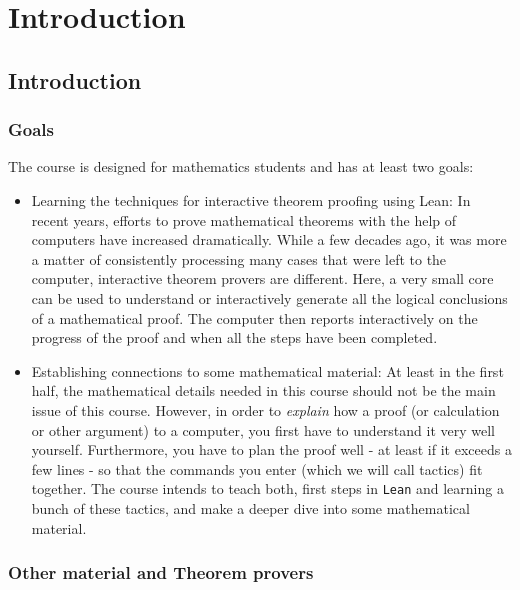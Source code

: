 \documentclass{memoir}
\begin{document}
\chapter{Introduction}



\section{Introduction}



\subsection{Goals}

The course is designed for mathematics students and has at least two goals:

\begin{itemize}
\item Learning the techniques for interactive theorem proofing using Lean: In recent years, efforts to prove mathematical theorems with the help of computers have increased dramatically. While a few decades ago, it was more a matter of consistently processing many cases that were left to the computer, interactive theorem provers are different. Here, a very small core can be used to understand or interactively generate all the logical conclusions of a mathematical proof. The computer then reports interactively on the progress of the proof and when all the steps have been completed.\item Establishing connections to some mathematical material: At least in the first half, the mathematical details needed in this course should not be the main issue of this course. However, in order to \emph{explain} how a proof (or calculation or other argument) to a computer, you first have to understand it very well yourself. Furthermore, you have to plan the proof well - at least if it exceeds a few lines - so that the commands you enter (which we will call tactics) fit together. The course intends to teach both, first steps in \Verb|Lean| and learning a bunch of these tactics, and make a deeper dive into some mathematical material.
\end{itemize}




\subsection{Other material and Theorem provers}
\end{document}
